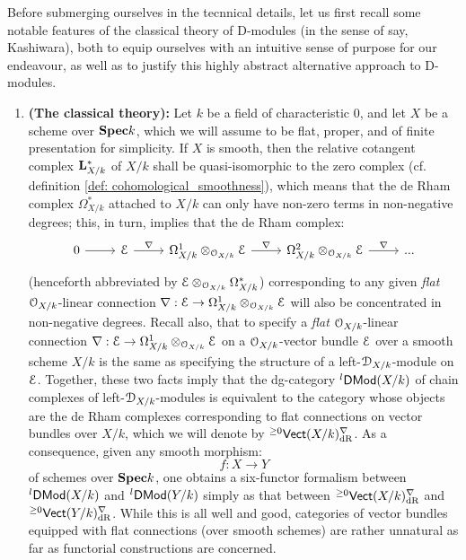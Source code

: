         Before submerging ourselves in the tecnnical details, let us first recall some notable features of the classical theory of D-modules (in the sense of say, Kashiwara), both to equip ourselves with an intuitive sense of purpose for our endeavour, as well as to justify this highly abstract alternative approach to D-modules. 
            \begin{enumerate}
                \item \textbf{(The classical theory):} Let $k$ be a field of characteristic $0$, and let $X$ be a scheme over $\mathbf{Spec} k$, which we will assume to be flat, proper, and of finite presentation for simplicity. If $X$ is smooth, then the relative cotangent complex $\mathbf{L}^*_{X/k}$ of $X/k$ shall be quasi-isomorphic to the zero complex (cf. definition \ref{def: cohomological_smoothness}), which means that the de Rham complex $\Omega^*_{X/k}$ attached to $X/k$ can only have non-zero terms in non-negative degrees; this, in turn, implies that the de Rham complex:
                    $$
                        \begin{tikzcd}
                        	0 & \E & {\Omega^1_{X/k} \tensor_{\calO_{X/k}} \E} & {\Omega^2_{X/k} \tensor_{\calO_{X/k}} \E} & {...}
                        	\arrow["\nabla", from=1-4, to=1-5]
                        	\arrow["\nabla", from=1-3, to=1-4]
                        	\arrow["\nabla", from=1-2, to=1-3]
                        	\arrow[from=1-1, to=1-2]
                        \end{tikzcd}
                    $$
                (henceforth abbreviated by $\E \tensor_{\calO_{X/k}} \Omega^*_{X/k}$) corresponding to any given \textit{flat} $\mathcal{O}_{X/k}$-linear connection $\nabla: \E \to \Omega^1_{X/k} \tensor_{\calO_{X/k}} \E$ will also be concentrated in non-negative degrees. Recall also, that to specify a \textit{flat} $\mathcal{O}_{X/k}$-linear connection $\nabla: \E \to \Omega^1_{X/k} \tensor_{\calO_{X/k}} \E$ on a $\mathcal{O}_{X/k}$-vector bundle $\mathcal{E}$ over a smooth scheme $X/k$ is the same as specifying the structure of a left-$\mathcal{D}_{X/k}$-module on $\mathcal{E}$. Together, these two facts imply that the dg-category ${}^l\mathsf{DMod}(X/k)$ of chain complexes of left-$\mathcal{D}_{X/k}$-modules is equivalent to the category whose objects are the de Rham complexes corresponding to flat connections on vector bundles over $X/k$, which we will denote by ${}^{\geq 0}\mathsf{Vect}(X/k)^{\nabla}_{\mathrm{dR}}$. As a consequence, given any smooth morphism:
                    $$f: X \to Y$$
                of schemes over $\mathbf{Spec} k$, one obtains a six-functor formalism between ${}^l\mathsf{DMod}(X/k)$ and ${}^l\mathsf{DMod}(Y/k)$ simply as that between ${}^{\geq 0}\mathsf{Vect}(X/k)^{\nabla}_{\mathrm{dR}}$ and ${}^{\geq 0}\mathsf{Vect}(Y/k)^{\nabla}_{\mathrm{dR}}$. While this is all well and good, categories of vector bundles equipped with flat connections (over smooth schemes) are rather unnatural as far as functorial constructions are concerned. 
                

\end{enumerate}
